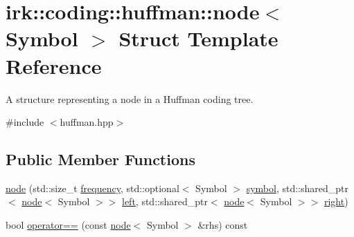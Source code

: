 \hypertarget{structirk_1_1coding_1_1huffman_1_1node}{}\section{irk\+:\+:coding\+:\+:huffman\+:\+:node$<$ Symbol $>$ Struct Template Reference}
\label{structirk_1_1coding_1_1huffman_1_1node}


A structure representing a node in a Huffman coding tree.  




{\ttfamily \#include $<$huffman.\+hpp$>$}

\subsection*{Public Member Functions}
\begin{DoxyCompactItemize}
\item 
\mbox{\hyperlink{structirk_1_1coding_1_1huffman_1_1node_ac43d799be382afcd794720a9c3294f4d}{node}} (std\+::size\+\_\+t \mbox{\hyperlink{structirk_1_1coding_1_1huffman_1_1node_ae303f67bca534f5fcbf2a64a586cd7a9}{frequency}}, std\+::optional$<$ Symbol $>$ \mbox{\hyperlink{structirk_1_1coding_1_1huffman_1_1node_a5506528b3c23fa2187b767a90ca3bfcc}{symbol}}, std\+::shared\+\_\+ptr$<$ \mbox{\hyperlink{structirk_1_1coding_1_1huffman_1_1node}{node}}$<$ Symbol $>$$>$ \mbox{\hyperlink{structirk_1_1coding_1_1huffman_1_1node_ac4303bd6570125c1d18506a8596f3b8f}{left}}, std\+::shared\+\_\+ptr$<$ \mbox{\hyperlink{structirk_1_1coding_1_1huffman_1_1node}{node}}$<$ Symbol $>$$>$ \mbox{\hyperlink{structirk_1_1coding_1_1huffman_1_1node_addc238c8601bb721a25a5750f6c33ebd}{right}})
\item 
bool \mbox{\hyperlink{structirk_1_1coding_1_1huffman_1_1node_a4e0666381a95883e54e9a952aefd3a31}{operator==}} (const \mbox{\hyperlink{structirk_1_1coding_1_1huffman_1_1node}{node}}$<$ Symbol $>$ \&rhs) const
\end{DoxyCompactItemize}
